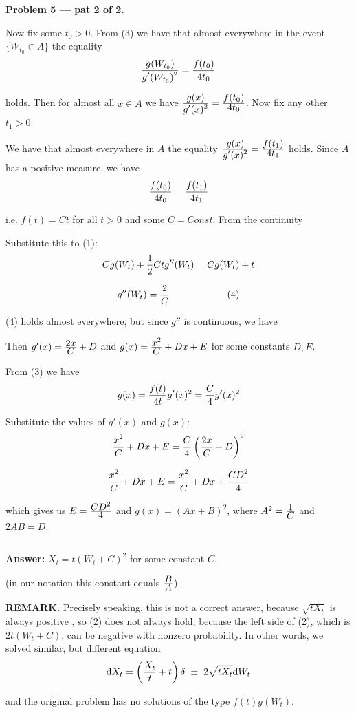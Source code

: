 \documentclass[pdftex,12pt,a4paper]{article}
\begin{document}
\textbf{Problem 5 --- pat 2 of 2.}\par

Now fix some $t_{0} > 0$. From (3) we have that almost everywhere in the event $\{W_{t_{0}} \in A\}$ the equality
$$
\frac{\displaystyle g(W_{t_{0}})}{\displaystyle g'(W_{t_{0}})^{2}} = \frac{\displaystyle f(t_{0})}{\displaystyle 4 t_{0}}
$$\par
holds. Then for almost all $x \in A$ we have $\frac{\displaystyle g(x)}{\displaystyle g'(x)^{2}} = \frac{\displaystyle f(t_{0})}{\displaystyle 4 t_{0}}$. Now fix any other $t_{1} > 0$.\par
We have that almost everywhere in $A$ the equality $\frac{\displaystyle g(x)}{\displaystyle g'(x)^{2}} = \frac{\displaystyle f(t_{1})}{\displaystyle 4 t_{1}}$ holds. Since $A$ has a positive measure, we have
$$
\frac{\displaystyle f(t_{0})}{\displaystyle 4t_{0}} = \frac{\displaystyle f(t_{1})}{\displaystyle 4t_{1}}
$$\par
i.e. $f(t) = Ct$ for all $t > 0$ and some $C = Const$. From the continuity \[\]\par
Substitute this to (1):
$$
Cg(W_{t}) + \frac{\displaystyle 1}{\displaystyle 2}Ctg''(W_{t}) = Cg(W_{t}) + t
$$

$$
g''(W_{t}) = \frac{\displaystyle 2}{\displaystyle C}\qquad\qquad\qquad (4)
$$\par
(4) holds almost everywhere, but since $g''$ is continuous, we have \par
Then $g'(x) =  \frac{\displaystyle 2x}{\displaystyle C} + D$ and $g(x) = \frac{\displaystyle x^{2}}{\displaystyle C} + Dx + E$ for some constants $D,E$.\par
From (3) we have
$$
g(x) = \frac{\displaystyle f(t)}{\displaystyle 4t}g'(x)^{2} = \frac{\displaystyle C}{\displaystyle 4}g'(x)^{2}
$$\par
Substitute the values of $g'(x)$ and $g(x)$:
$$
\frac{\displaystyle x^{2}}{\displaystyle C} + Dx + E = \frac{\displaystyle C}{\displaystyle 4}\left(\frac{\displaystyle 2x}{\displaystyle C} + D\right)^{2}
$$

$$
\frac{\displaystyle x^{2}}{\displaystyle C} + Dx + E = \frac{\displaystyle x^{2}}{\displaystyle C} + Dx + \frac{\displaystyle CD^{2}}{\displaystyle 4}
$$\par
which gives us $E =  \frac{\displaystyle CD^{2}}{\displaystyle 4}$ and $g(x) = (Ax + B)^{2}$, where $A^{2} = \frac{\displaystyle 1}{\displaystyle C}$ and $2AB = D$.\par
\[\]\par
\textbf{Answer:} $X_{t} = t(W_{t} + C)^{2}$ for some constant $C$.\par
(in our notation this constant equals $\frac{\displaystyle B}{\displaystyle A}$)\par
\textbf{REMARK.} Precisely speaking, this is not a correct answer, because $\sqrt{tX_{t}}$ is always positive , so (2) does not always hold, because the left side of (2), which is $2t(W_{t} + C)$, can be negative with nonzero probability. In other words, we solved similar, but different equation
$$
\mathrm{d}X_{t} = \left(\frac{\displaystyle X_{t}}{\displaystyle t} + t\right)\delta\ \pm\ 2\sqrt{t X_{t}}\mathrm{d}W_{t}
$$\par
and the original problem has no solutions of the type $f(t)g(W_{t})$.
 
\end{document}
